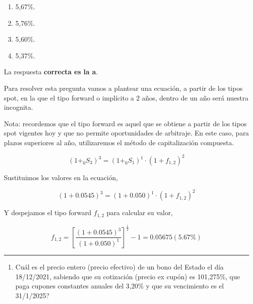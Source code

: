 \documentclass[
  letterpaper,
  DIV=11,
  numbers=noendperiod]{scrreprt}
\providecommand{\tightlist}{%
  \setlength{\itemsep}{0pt}\setlength{\parskip}{0pt}}\usepackage{longtable,booktabs,array}
\begin{document}
\begin{enumerate}
\def\labelenumi{\alph{enumi}.}
\item
  5,67\%.
\item
  5,76\%.
\item
  5,60\%.
\item
  5,37\%.
\end{enumerate}

\begin{tcolorbox}[enhanced jigsaw, left=2mm, opacityback=0, colback=white, breakable, arc=.35mm, bottomrule=.15mm, rightrule=.15mm, toprule=.15mm, leftrule=.75mm, colframe=quarto-callout-tip-color-frame]
\begin{minipage}[t]{5.5mm}
\textcolor{quarto-callout-tip-color}{\faLightbulb}
\end{minipage}%
\begin{minipage}[t]{\textwidth - 5.5mm}

La respuesta \textbf{correcta es la a}.

Para resolver esta pregunta vamos a plantear una ecuación, a partir de
los tipos spot, en la que el tipo forward o implícito a 2 años, dentro
de un año será nuestra incognita.

Nota: recordemos que el tipo forward es aquel que se obtiene a partir de
los tipos spot vigentes hoy y que no permite oportunidades de arbitraje.
En este caso, para plazos superiores al año, utilizaremos el método de
capitalización compuesta.

\[\left(1+_0S_3\right)^3=\left(1+_{0}S_{1}\right)^{1}\cdot\left(1+f_{1,2}\right)^{2}\]

Sustituimos los valores en la ecuación,

\[\left(1+0.0545\right)^3=\left(1+0.050\right)^{1}\cdot\left(1+f_{1,2}\right)^{2}\]

Y despejamos el tipo forward \(f_{1,2}\) para calcular su valor,

\[f_{1,2}=\left[\frac{\left(1+0.0545\right)^3}{ \left(1+0.050\right)^{1}}\right]^{\frac{1 }{2 }}-1=0.05675(5.67\%)\]

\end{minipage}%
\end{tcolorbox}

\begin{center}\rule{0.5\linewidth}{0.5pt}\end{center}

\begin{enumerate}
\def\labelenumi{\arabic{enumi}.}
\setcounter{enumi}{41}
\tightlist
\item
  Cuál es el precio entero (precio efectivo) de un bono del Estado el
  día 18/12/2021, sabiendo que su cotización (precio ex cupón) es
  101,275\%, que paga cupones constantes anuales del 3,20\% y que su
  vencimiento es el 31/1/2025?
\end{enumerate}
\end{document}

